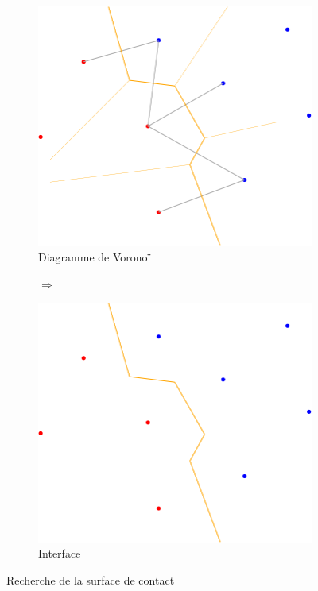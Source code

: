 \begin{figure}[ht]
\centering
\begin{subfigure}{0.45\textwidth}
  \centering
  \includegraphics[width=\textwidth]{figures/process_d_3.png}
  \caption{Diagramme de Voronoï}
  \label{fig::process_d_3}
\end{subfigure}%
\begin{subfigure}{0.1\textwidth}
  \centering
  $\Longrightarrow$
\end{subfigure}%
\begin{subfigure}{0.45\textwidth}
  \centering
  \includegraphics[width=\textwidth]{figures/process_d_4.png}
  \caption{Interface}
  \label{fig::process_d_4}
\end{subfigure}
\caption{Recherche de la surface de contact}
\label{fig::delaunays_process_2}
\end{figure}


